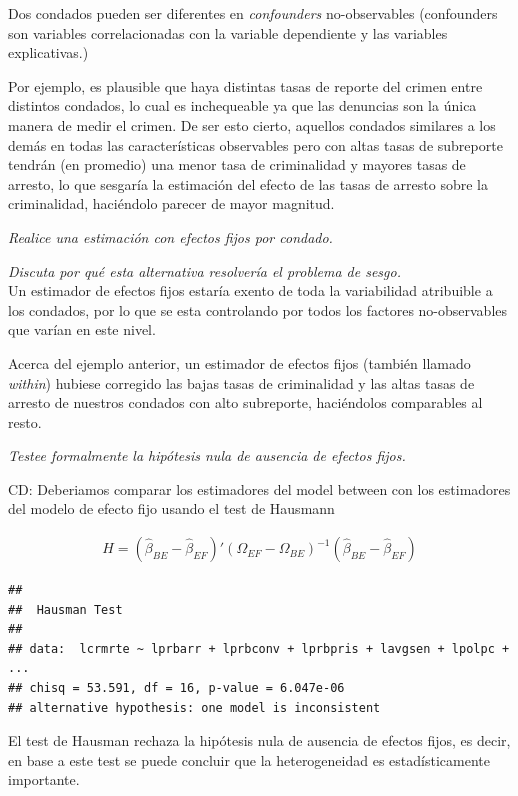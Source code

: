 \documentclass[
]{article}
\begin{document}
Dos condados pueden ser diferentes en \emph{confounders} no-observables
(confounders son variables correlacionadas con la variable dependiente y
las variables explicativas.)

Por ejemplo, es plausible que haya distintas tasas de reporte del crimen
entre distintos condados, lo cual es inchequeable ya que las denuncias
son la única manera de medir el crimen. De ser esto cierto, aquellos
condados similares a los demás en todas las características observables
pero con altas tasas de subreporte tendrán (en promedio) una menor tasa
de criminalidad y mayores tasas de arresto, lo que sesgaría la
estimación del efecto de las tasas de arresto sobre la criminalidad,
haciéndolo parecer de mayor magnitud.

\emph{Realice una estimación con efectos fijos por condado.}

\emph{Discuta por qué esta alternativa resolvería el problema de sesgo.
}\\
Un estimador de efectos fijos estaría exento de toda la variabilidad
atribuible a los condados, por lo que se esta controlando por todos los
factores no-observables que varían en este nivel.

Acerca del ejemplo anterior, un estimador de efectos fijos (también
llamado \emph{within}) hubiese corregido las bajas tasas de criminalidad
y las altas tasas de arresto de nuestros condados con alto subreporte,
haciéndolos comparables al resto.

\emph{Testee formalmente la hipótesis nula de ausencia de efectos fijos.
}

CD: Deberiamos comparar los estimadores del model between con los
estimadores del modelo de efecto fijo usando el test de Hausmann

\begin{gather*}
H = ( \hat \beta_{BE} - \hat \beta_{EF})' (\Omega_{EF}-\Omega_{BE})^{-1}  ( \hat \beta_{BE} - \hat \beta_{EF})
\end{gather*}

\begin{verbatim}
## 
##  Hausman Test
## 
## data:  lcrmrte ~ lprbarr + lprbconv + lprbpris + lavgsen + lpolpc +  ...
## chisq = 53.591, df = 16, p-value = 6.047e-06
## alternative hypothesis: one model is inconsistent
\end{verbatim}

El test de Hausman rechaza la hipótesis nula de ausencia de efectos
fijos, es decir, en base a este test se puede concluir que la
heterogeneidad es estadísticamente importante.
\end{document}
